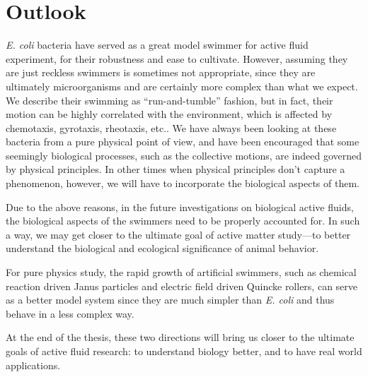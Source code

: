 \section{Outlook}

\textit{E. coli} bacteria have served as a great model swimmer for active fluid experiment, for their robustness and ease to cultivate. However, assuming they are just reckless swimmers is sometimes not appropriate, since they are ultimately microorganisms and are certainly more complex than what we expect. We describe their swimming as ``run-and-tumble'' fashion, but in fact, their motion can be highly correlated with the environment, which is affected by chemotaxis, gyrotaxis, rheotaxis, etc.. We have always been looking at these bacteria from a pure physical point of view, and have been encouraged that some seemingly biological processes, such as the collective motions, are indeed governed by physical principles. In other times when physical principles don't capture a phenomenon, however, we will have to incorporate the biological aspects of them.

Due to the above reasons, in the future investigations on biological active fluids, the biological aspects of the swimmers need to be properly accounted for. In such a way, we may get closer to the ultimate goal of active matter study---to better understand the biological and ecological significance of animal behavior.

For pure physics study, the rapid growth of artificial swimmers, such as chemical reaction driven Janus particles and electric field driven Quincke rollers, can serve as a better model system since they are much simpler than \textit{E. coli} and thus behave in a less complex way.

At the end of the thesis, these two directions will bring us closer to the ultimate goals of active fluid research: to understand biology better, and to have real world applications.
